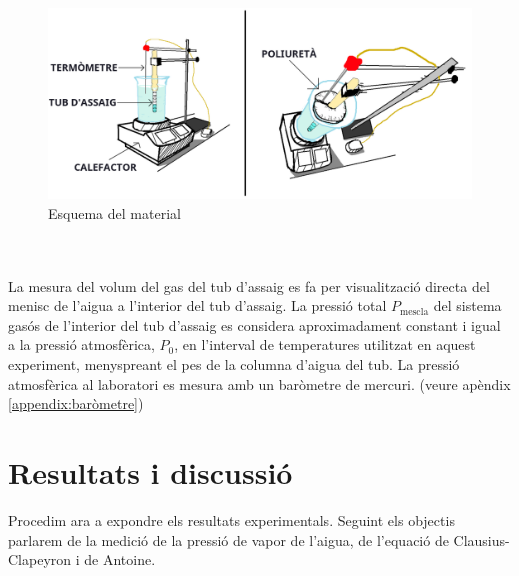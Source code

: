 \documentclass{article}
\begin{document}
    \begin{figure}
        \centering
        \includegraphics[width=.45\textwidth]{fotos/esquemaSetup.png}
        \caption{Esquema del material}
        \label{fig:esquema experimental}
    \end{figure}

    \hfill{}\\\hfill{}\\
    La mesura del volum del gas del tub d’assaig es fa per visualització directa del menisc de l’aigua a l’interior del tub d’assaig. La pressió total $P_{\text{mescla}}$ del sistema gasós de l’interior del tub d’assaig es considera aproximadament constant i igual a la pressió atmosfèrica, $P_0$, en l’interval de temperatures utilitzat en aquest experiment, menyspreant el pes de la columna d’aigua del tub. La pressió atmosfèrica al laboratori es mesura amb un baròmetre de mercuri. (veure apèndix \ref{appendix:baròmetre})

    
\section{Resultats i discussió}
    Procedim ara a expondre els resultats experimentals. Seguint els objectis parlarem de la medició de la pressió de vapor de l'aigua, de l'equació de Clausius-Clapeyron i de Antoine. 
\end{document}
